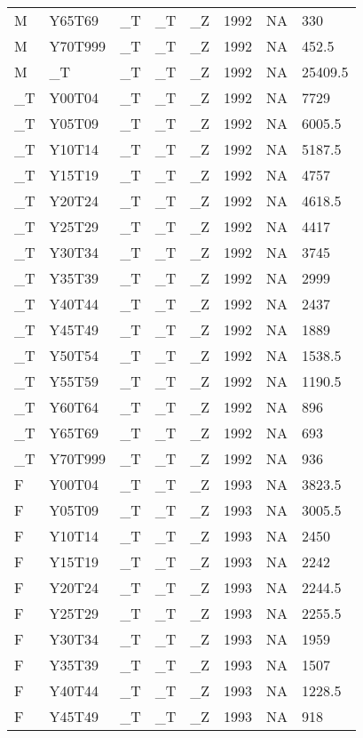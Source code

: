 \begin{longtable}[t]{llllllll}
M & Y65T69 & \_T & \_T & \_Z & 1992 & NA & 330\\
M & Y70T999 & \_T & \_T & \_Z & 1992 & NA & 452.5\\
M & \_T & \_T & \_T & \_Z & 1992 & NA & 25409.5\\
\_T & Y00T04 & \_T & \_T & \_Z & 1992 & NA & 7729\\
\addlinespace
\_T & Y05T09 & \_T & \_T & \_Z & 1992 & NA & 6005.5\\
\_T & Y10T14 & \_T & \_T & \_Z & 1992 & NA & 5187.5\\
\_T & Y15T19 & \_T & \_T & \_Z & 1992 & NA & 4757\\
\_T & Y20T24 & \_T & \_T & \_Z & 1992 & NA & 4618.5\\
\_T & Y25T29 & \_T & \_T & \_Z & 1992 & NA & 4417\\
\addlinespace
\_T & Y30T34 & \_T & \_T & \_Z & 1992 & NA & 3745\\
\_T & Y35T39 & \_T & \_T & \_Z & 1992 & NA & 2999\\
\_T & Y40T44 & \_T & \_T & \_Z & 1992 & NA & 2437\\
\_T & Y45T49 & \_T & \_T & \_Z & 1992 & NA & 1889\\
\_T & Y50T54 & \_T & \_T & \_Z & 1992 & NA & 1538.5\\
\addlinespace
\_T & Y55T59 & \_T & \_T & \_Z & 1992 & NA & 1190.5\\
\_T & Y60T64 & \_T & \_T & \_Z & 1992 & NA & 896\\
\_T & Y65T69 & \_T & \_T & \_Z & 1992 & NA & 693\\
\_T & Y70T999 & \_T & \_T & \_Z & 1992 & NA & 936\\
F & Y00T04 & \_T & \_T & \_Z & 1993 & NA & 3823.5\\
\addlinespace
F & Y05T09 & \_T & \_T & \_Z & 1993 & NA & 3005.5\\
F & Y10T14 & \_T & \_T & \_Z & 1993 & NA & 2450\\
F & Y15T19 & \_T & \_T & \_Z & 1993 & NA & 2242\\
F & Y20T24 & \_T & \_T & \_Z & 1993 & NA & 2244.5\\
F & Y25T29 & \_T & \_T & \_Z & 1993 & NA & 2255.5\\
\addlinespace
F & Y30T34 & \_T & \_T & \_Z & 1993 & NA & 1959\\
F & Y35T39 & \_T & \_T & \_Z & 1993 & NA & 1507\\
F & Y40T44 & \_T & \_T & \_Z & 1993 & NA & 1228.5\\
F & Y45T49 & \_T & \_T & \_Z & 1993 & NA & 918\\

\end{longtable}
